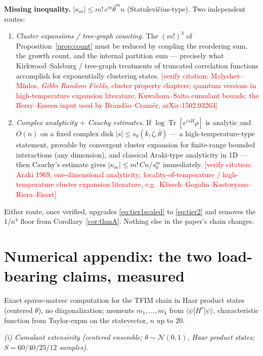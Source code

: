 \documentclass[11pt]{article}
\theoremstyle{remark}
\newcommand{\Tr}{\operatorname{Tr}}
\newcommand{\verifycite}[1]{\textcolor{red}{\textsf{[verify citation: #1]}}}
\begin{document}
\noindent\textbf{Missing inequality.} $|\kappa_m|\le m!\,c^m\bar\theta^m n$
(Statulevi\v{c}ius-type). Two independent routes:

\begin{enumerate}[leftmargin=2em]
\item \emph{Cluster expansions / tree-graph counting.} The $(m!)^3$ of
Proposition~\ref{prop:count} must be reduced by coupling the reordering sum,
the growth count, and the internal partition sum --- precisely what
Kirkwood--Salsburg / tree-graph treatments of truncated correlation
functions accomplish for exponentially clustering states.
\verifycite{Malyshev--Minlos, \emph{Gibbs Random Fields}, cluster property
chapters; quantum versions in high-temperature expansion literature;
Kuwahara--Saito cumulant bounds; the Berry--Esseen input used by
Brand\~ao--Cram\'er, arXiv:1502.03263}
\item \emph{Complex analyticity $+$ Cauchy estimates.} If
$\log\Tr[e^{isH}\rho]$ is analytic and $O(n)$ on a fixed complex disk
$|s|\le s_0(k,\zeta,\bar\theta)$ --- a high-temperature-type statement,
provable by convergent cluster expansion for finite-range bounded
interactions (any dimension), and classical Araki-type analyticity in 1D ---
then Cauchy's estimate gives $|\kappa_m|\le m!\,Cn/s_0^m$ immediately.
\verifycite{Araki 1969, one-dimensional analyticity; locality-of-temperature
/ high-temperature cluster expansion literature, e.g.\
Kliesch--Gogolin--Kastoryano--Riera--Eisert}
\end{enumerate}

Either route, once verified, upgrades \eqref{eq:tier1scaled} to
\eqref{eq:tier2} and removes the $1/\kappa^4$ floor from
Corollary~\ref{cor:thmA}. Nothing else in the paper's chain changes.

\section{Numerical appendix: the two load-bearing claims, measured}
\label{sec:numerics}

Exact sparse-matvec computation for the TFIM chain in Haar product states
(centered $\theta$), no diagonalization; moments $m_1,\dots,m_4$ from
$\langle\psi|H^r|\psi\rangle$, characteristic function from Taylor-expm on
the statevector, $n$ up to $20$.

\medskip
\noindent\emph{(i) Cumulant extensivity (centered ensemble;
$\theta\sim\mathcal N(0,1)$, Haar product states; $S=60/40/25/12$ samples).}
\end{document}
